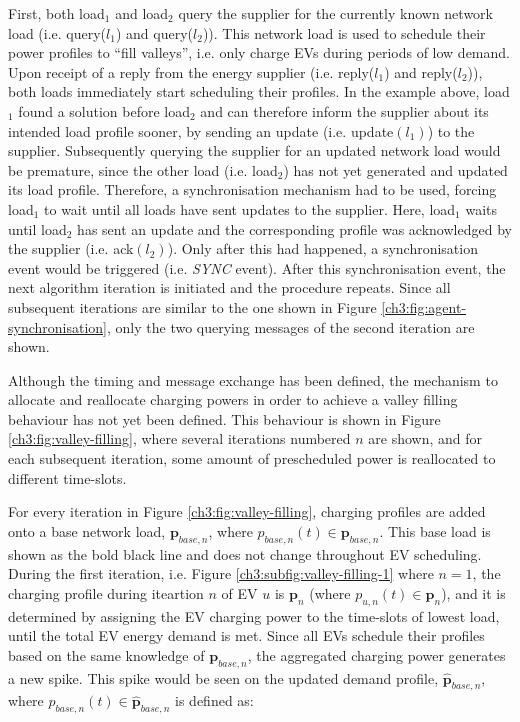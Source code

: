 First, both load$_1$ and load$_2$ query the supplier for the currently known network load (i.e. query($l_1$) and query($l_2$)).
This network load is used to schedule their power profiles to ``fill valleys'', i.e. only charge EVs during periods of low demand.
Upon receipt of a reply from the energy supplier (i.e. reply($l_1$) and reply($l_2$)), both loads immediately start scheduling their profiles.
In the example above, load$_1$ found a solution before load$_2$ and can therefore inform the supplier about its intended load profile sooner, by sending an update (i.e. update$(l_1)$) to the supplier.
Subsequently querying the supplier for an updated network load would be premature, since the other load (i.e. load$_2$) has not yet generated and updated its load profile.
Therefore, a synchronisation mechanism had to be used, forcing load$_1$ to wait until all loads have sent updates to the supplier.
Here, load$_1$ waits until load$_2$ has sent an update and the corresponding profile was acknowledged by the supplier (i.e. ack$(l_2)$).
Only after this had happened, a synchronisation event would be triggered (i.e. \textit{SYNC} event).
After this synchronisation event, the next algorithm iteration is initiated and the procedure repeats.
Since all subsequent iterations are similar to the one shown in Figure \ref{ch3:fig:agent-synchronisation}, only the two querying messages of the  second iteration are shown.

Although the timing and message exchange has been defined, the mechanism to allocate and reallocate charging powers in order to achieve a valley filling behaviour has not yet been defined.
This behaviour is shown in Figure \ref{ch3:fig:valley-filling}, where several iterations numbered $n$ are shown, and for each subsequent iteration, some amount of prescheduled power is reallocated to different time-slots.



For every iteration in Figure \ref{ch3:fig:valley-filling}, charging profiles are added onto a base network load, $\textbf{p}_{base,n}$, where $p_{base,n}(t) \in \textbf{p}_{base,n}$.
This base load is shown as the bold black line and does not change throughout EV scheduling.
During the first iteration, i.e. Figure \ref{ch3:subfig:valley-filling-1} where $n=1$, the charging profile during iteartion $n$ of EV $u$ is $\textbf{p}_n$ (where $p_{u,n}(t) \in \textbf{p}_n$), and it is determined by assigning the EV charging power to the time-slots of lowest load, until the total EV energy demand is met.
Since all EVs schedule their profiles based on the same knowledge of $\textbf{p}_{base,n}$, the aggregated charging power generates a new spike.
This spike would be seen on the updated demand profile, $\hat{\textbf{p}}_{base, n}$, where $\hat{p}_{base, n}(t) \in \hat{\textbf{p}}_{base, n}$ is defined as:

